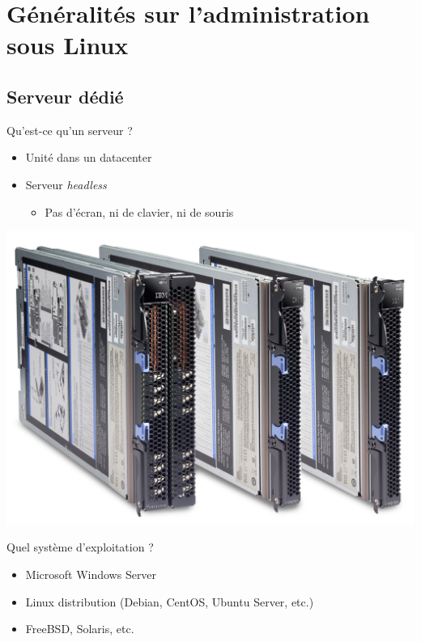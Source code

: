 \section{Généralités sur l'administration sous Linux}
\subsection{Serveur dédié}

\begin{frame}{Qu'est-ce qu'un serveur ?}

\begin{itemize}
  \item Unité dans un datacenter
  \item Serveur \textit{headless}
  \begin{itemize}
    \item Pas d'écran, ni de clavier, ni de souris
  \end{itemize}
\end{itemize}
  \begin{center} 
      \includegraphics[scale=0.50]{Images/server.png}
  \end{center}

\end{frame}
\begin{frame}{Quel système d'exploitation ?}

\begin{itemize}
  \item Microsoft Windows Server
  \item Linux distribution (Debian, CentOS, Ubuntu Server, etc.)
  \item FreeBSD, Solaris, etc.

\end{itemize}

\end{frame}
